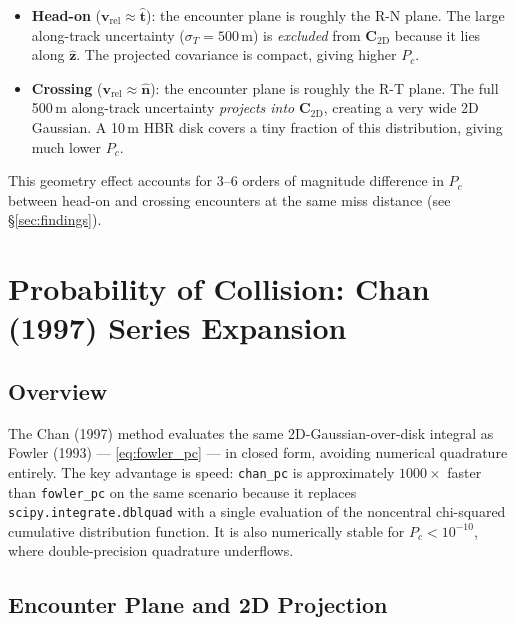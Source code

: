 \documentclass[11pt]{article}
\begin{document}
\begin{itemize}
  \item \textbf{Head-on} ($\mathbf{v}_\text{rel} \approx \hat{\mathbf{t}}$):
    the encounter plane is roughly the R-N plane.  The large along-track
    uncertainty ($\sigma_T = 500$\,m) is \emph{excluded} from $\mathbf{C}_\text{2D}$
    because it lies along $\hat{\mathbf{z}}$.  The projected covariance is
    compact, giving higher $P_c$.
  \item \textbf{Crossing} ($\mathbf{v}_\text{rel} \approx \hat{\mathbf{n}}$):
    the encounter plane is roughly the R-T plane.  The full 500\,m along-track
    uncertainty \emph{projects into} $\mathbf{C}_\text{2D}$, creating a very
    wide 2D Gaussian.  A 10\,m HBR disk covers a tiny fraction of this
    distribution, giving much lower $P_c$.
\end{itemize}

This geometry effect accounts for 3--6 orders of magnitude difference in $P_c$
between head-on and crossing encounters at the same miss distance (see
\S\ref{sec:findings}).

\section{Probability of Collision: Chan (1997) Series Expansion}
\label{sec:chan}

\subsection{Overview}

The Chan (1997) method evaluates the same 2D-Gaussian-over-disk integral as
Fowler (1993) — \eqref{eq:fowler_pc} — in closed form, avoiding numerical
quadrature entirely.  The key advantage is speed: \texttt{chan\_pc} is
approximately $1000\times$ faster than \texttt{fowler\_pc} on the same
scenario because it replaces \texttt{scipy.integrate.dblquad} with a single
evaluation of the noncentral chi-squared cumulative distribution function.  It
is also numerically stable for $P_c < 10^{-10}$, where double-precision
quadrature underflows.

\subsection{Encounter Plane and 2D Projection}
\end{document}
